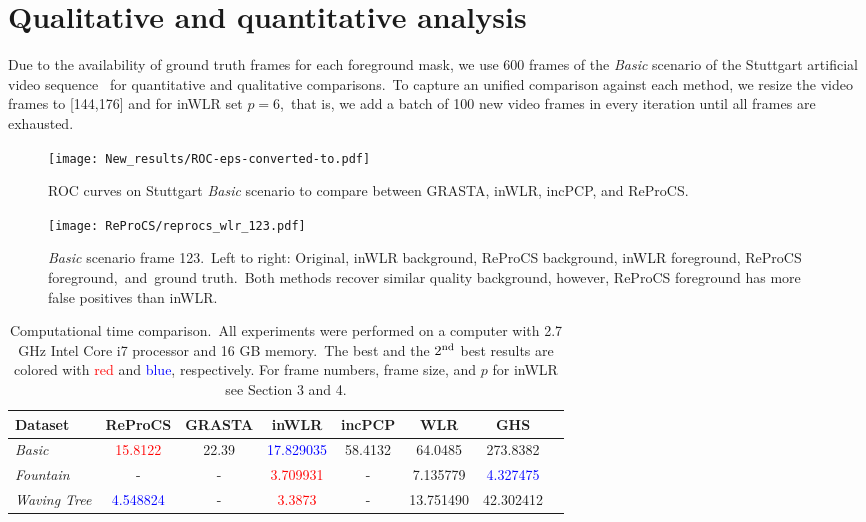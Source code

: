 \documentclass[10pt,twocolumn,letterpaper]{article}
\begin{document}
\section{Qualitative and quantitative analysis}
\vspace{-0.0in}
Due to the availability of ground truth frames for each foreground mask, we use 600 frames of the {\it Basic} scenario of the Stuttgart artificial video sequence~\cite{cvpr11brutzer} for quantitative and qualitative comparisons.~To capture an unified comparison against each method, we resize the video frames to [144,176] and for inWLR set $p=6$,~that is, we add a batch of 100 new video frames in every iteration until all frames are exhausted.
\begin{figure}
    \centering
    \texttt{[image: New\_results/ROC-eps-converted-to.pdf]}
    \caption{ROC curves on Stuttgart {\it Basic} scenario to compare between GRASTA, inWLR, incPCP, and ReProCS.}
    \label{grasta_roc}
\end{figure}
\begin{figure*}
    \centering
    \texttt{[image: ReProCS/reprocs\_wlr\_123.pdf]}
    \caption{{\it Basic} scenario frame 123.~Left to right: Original, inWLR background, ReProCS background, inWLR foreground, ReProCS foreground,~and~ground truth.~Both methods recover similar quality background, however, ReProCS foreground has more false positives than inWLR.}
    \label{reprocs_123}
\end{figure*}
\begin{table*}
\begin{center}
\begin{tabular}{|l|c|c|c|c|c|c|c|}
\hline
Dataset & ReProCS & GRASTA & inWLR & incPCP & WLR & GHS \\
\hline
{\it Basic}& \textcolor{red}{15.8122} & 22.39 & \textcolor{blue}{17.829035} & 58.4132 & 64.0485 & 273.8382\\
\hline
{\it Fountain} &- & - & \textcolor{red}{3.709931} & - & 7.135779 &  \textcolor{blue}{4.327475}\\
\hline
{\it Waving Tree}&\textcolor{blue}{4.548824}&-&\textcolor{red}{3.3873}&-&13.751490&42.302412\\
\hline
\end{tabular}
\end{center}
\caption{Computational time comparison.~All experiments were performed on a computer with 2.7 GHz Intel Core i7 processor and 16 GB memory.~The best and the $2^{\rm nd}$ best results are colored with \textcolor{red}{red} and \textcolor{blue}{blue}, respectively. For frame numbers, frame size, and $p$ for inWLR see Section 3 and 4.}\label{time}
\end{table*}
\end{document}
